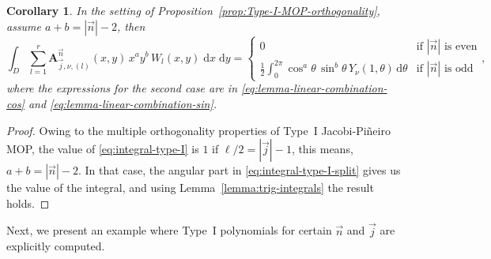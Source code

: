 \documentclass[a4paper]{article}
\theoremstyle{plain}
\newtheorem{corollary}[theorem]{Corollary}
\theoremstyle{definition}
\newcommand{\dr}{\mathrm{d}}
\newcommand{\dxdy}{\;\mathrm{d} x\;\mathrm{d} y}
\begin{document}
    \begin{corollary} In the setting of Proposition~\ref{prop:Type-I-MOP-orthogonality}, assume $a+b=|\vec n|-2$, then
    $$
    \int_D \sum_{l=1}^r \mathbf A_{\vec j,\nu,(l)}^{\vec n}(x,y) \, x^a y^b \, W_l(x,y) \dxdy = \begin{cases}
        0 &  \text{if } |\vec n| \text{ is even}\\
        \frac 1 2 \int_{0}^{2\pi}\cos^a\theta\,\sin^b\theta \, Y_\nu(1, \theta)\,\dr\theta & \text{if }|\vec n|\text{ is odd }
    \end{cases},
    $$
    where the expressions for the second case are in  \eqref{eq:lemma-linear-combination-cos} and \eqref{eq:lemma-linear-combination-sin}.
    \end{corollary}
    \begin{proof}
        Owing to the multiple orthogonality properties of Type~I Jacobi-Pi\~neiro MOP, the value of \eqref{eq:integral-type-I} is $1$ if $\ell/2=|\vec j|-1$, this means, $a+b=|\vec n|-2$. In that case, the angular part in \eqref{eq:integral-type-I-split} gives us the value of the integral, and using Lemma~\ref{lemma:trig-integrals} the result holds.
    \end{proof}
    
    Next, we present an example where Type~I polynomials for certain $\vec n$ and $\vec j$ are explicitly computed.
\end{document}
